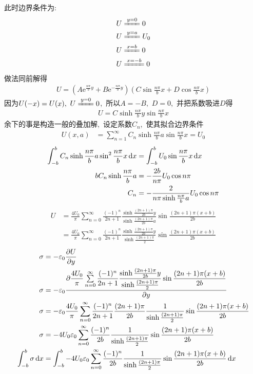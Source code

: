 此时边界条件为:
\begin{align*}
        U&\xlongequal{y=0}0\\
    U&\xlongequal{y=a}U_0\\
    U&\xlongequal{x=b}0\\
    U&\xlongequal{x=-b}0
\end{align*}
做法同前解得
\begin{align*}
    U=(A\mathrm{e}^{\frac{n\pi }{b}y}+B\mathrm{e}^{-\frac{n\pi }{b}y})(C\sin \frac{n\pi}{b}x+D\cos \frac{n\pi}{b}x)
\end{align*}
因为$U(-x)=U(x),\, \,U\xlongequal{y=0}0$, \,所以$A=-B,\, \,D=0$, \,并把系数吸进$D$得
\begin{align*}
    U=C\sinh\frac{n\pi}{b} y\sin \frac{n\pi}{b}x
\end{align*}
余下的事是构造一般的叠加解, \,设定系数$C_n$, \,使其拟合边界条件
\begin{align*}
    U(x,a)&=\sum_{n=1}^{\infty}C_n\sinh\frac{n\pi}{b} a\sin \frac{n\pi}{b}x=U_0
\end{align*}
\begin{align*}
    \int_{-b}^{b}C_n\sinh\frac{n\pi}{b} a\sin^2 \frac{n\pi}{b}x\dif x
    &=\int_{-b}^{b}U_0\sin \frac{n\pi}{b}x\dif x\\
    bC_n\sinh\frac{n\pi}{b} a
    &=-\frac{2b}{n\pi}U_0\cos {n\pi}\\
    C_n
    &=-\frac{2}{n\pi\sinh\frac{n\pi}{b} a}U_0\cos {n\pi}
\end{align*}
\begin{align*}
    U&=\frac{4U_0}{\pi}\sum_{n=0}^{\infty}\frac{(-1)^n}{2n+1}\frac{\sinh\frac{(2n+1)\pi}{2b}y}{\sinh\frac{(2n+1)\pi}{2b}a}\sin\frac{(2n+1)\pi(x+b)}{2b}\\
    &=\frac{4U_0}{\pi}\sum_{n=0}^{\infty}\frac{(-1)^n}{2n+1}\frac{\sinh\frac{(2n+1)\pi}{2b}y}{\sinh\frac{(2n+1)\pi}{2}}\sin\frac{(2n+1)\pi(x+b)}{2b}
\end{align*}
\begin{align*}
    \sigma&=-\varepsilon_0\frac{\partial U}{\partial y}\\
    \sigma&=-\varepsilon_0\dfrac{\partial \dfrac{4U_0}{\pi}\sum\limits_{n=0}^{\infty}\dfrac{(-1)^n}{2n+1}\dfrac{\sinh\frac{(2n+1)\pi}{2b}y}{\sinh\frac{(2n+1)\pi}{2}}\sin\dfrac{(2n+1)\pi(x+b)}{2b}}{\partial y}\\
    \sigma&=-\varepsilon_0{ \dfrac{4U_0}{\pi}\sum\limits_{n=0}^{\infty}\dfrac{(-1)^n}{2n+1}\frac{(2n+1)\pi}{2b}\dfrac{1}{\sinh\frac{(2n+1)\pi}{2}}\sin\dfrac{(2n+1)\pi(x+b)}{2b}}\\
    \sigma&=-4U_0\varepsilon_0\sum\limits_{n=0}^{\infty}\dfrac{(-1)^n}{2b}\dfrac{1}{\sinh\frac{(2n+1)\pi}{2}}\sin\dfrac{(2n+1)\pi(x+b)}{2b}\\
    \int_{-b}^b\sigma\dif x&=\int_{-b}^b-4U_0\varepsilon_0\sum\limits_{n=0}^{\infty}\dfrac{(-1)^n}{2b}\dfrac{1}{\sinh\frac{(2n+1)\pi}{2}}\sin\dfrac{(2n+1)\pi(x+b)}{2b}\dif x
\end{align*}
